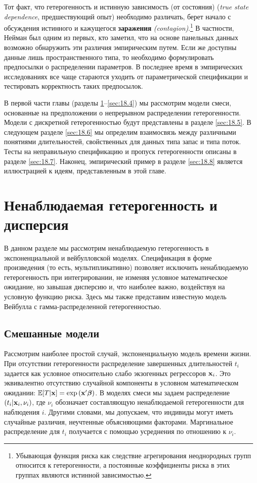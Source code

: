 Тот факт, что гетерогенность и истинную зависимость (от состояния) (\textit{true state dependence}, предшествующий опыт) необходимо различать, берет начало с обсуждения истинного и кажущегося \textbf{заражения} \textit{(contagion)}.\footnote{Убывающая функция риска как следствие агрегирования неоднородных групп относится к гетерогенности, а постоянные коэффициенты риска в этих группах являются истинной зависимостью.} В частности, Нейман был одним из первых, кто заметил, что на основе панельных данных возможно обнаружить эти различия эмпирическим путем. Если же доступны данные лишь пространственного типа, то необходимо формулировать предпосылки о распределении параметров. В последнее время в эмпирических исследованиях все чаще стараются уходить от параметрической спецификации и тестировать корректность таких предпосылок.

В первой части главы (разделы \ref{sec:18.2}--\ref{sec:18.4}) мы рассмотрим модели смеси, основанные на предположении о непрерывном распределении гетерогенности. Модели с дискретной гетерогенностью будут представлены в разделе \ref{sec:18.5}. В следующем разделе \ref{sec:18.6} мы определим взаимосвязь между различными понятиями длительностей, свойственных для данных типа запас и типа поток. Тесты на неправильную спецификацию и пропуск гетерогенности описаны в разделе \ref{sec:18.7}. Наконец, эмпирический пример в разделе \ref{sec:18.8} является иллюстрацией к идеям, представленным в этой главе.




\section{Ненаблюдаемая гетерогенность и дисперсия}
\label{sec:18.2}

\noindent
В данном разделе мы рассмотрим ненаблюдаемую гетерогенность в экспоненциальной и вейбулловской моделях. Спецификация в форме произведения (то есть, мультипликативно) позволяет исключить ненаблюдаемую гетерогенность при интегрировании, не изменяя условное математическое ожидание, но завышая дисперсию и, что наиболее важно, воздействуя на условную функцию риска. Здесь мы также представим известную модель Вейбулла с гамма-распределенной гетерогенностью.


\subsection{Смешанные модели}\label{sec:18.2.1}

\noindent
Рассмотрим наиболее простой случай, экспоненциальную модель времени жизни. При отсутствии гетерогенности распределение завершенных длительностей $t_i$ задается как условное относительно слабо экзогенных регрессоров $\mathbf{x}_i$. Это эквивалентно отсутствию случайной компоненты в условном математическом ожидании: $\mathbb{E}[T|\mathbf{x}]=\exp{(\mathbf{x}'\bm{\beta})}$. В моделях смеси мы задаем распределение $(t_i|\mathbf{x}_i,\nu_i)$, где $\nu_i$ обозначает составляющую ненаблюдаемой гетерогенности для наблюдения $i$. Другими словами, мы допускаем, что индивиды могут иметь случайные различия, неучтенные объясняющими факторами. Маргинальное распределение для $t_i$ получается с помощью усреднения по отношению к $\nu_i$.

